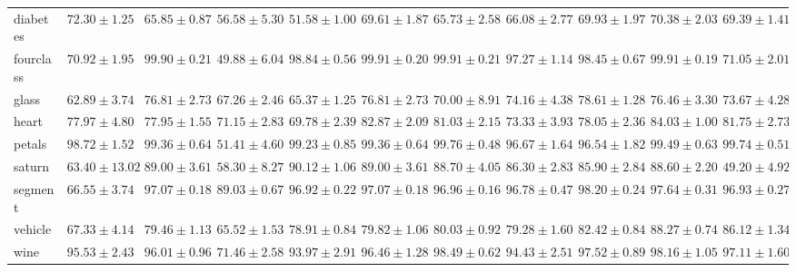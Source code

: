 \begin{sidewaystable}
\begin{tabular}{l||l|l|l|l|l|l|l|l|l|l|}
diabetes& $\mathbf{72.30\pm1.25}$& $65.85\pm0.87$& $56.58\pm5.30$& $51.58\pm1.00$& $69.61\pm1.87$& $65.73\pm2.58$& $66.08\pm2.77$& $69.93\pm1.97$& $70.38\pm2.03$& $69.39\pm1.41$\\ 
fourclass& $70.92\pm1.95$& $\mathbf{99.90\pm0.21}$& $49.88\pm6.04$& $98.84\pm0.56$& $\mathbf{99.91\pm0.20}$& $\mathbf{99.91\pm0.21}$& $97.27\pm1.14$& $98.45\pm0.67$& $\mathbf{99.91\pm0.19}$& $71.05\pm2.01$\\ 
glass& $62.89\pm3.74$& $76.81\pm2.73$& $67.26\pm2.46$& $65.37\pm1.25$& $76.81\pm2.73$& $70.00\pm8.91$& $74.16\pm4.38$& $\mathbf{78.61\pm1.28}$& $76.46\pm3.30$& $73.67\pm4.28$\\ 
heart& $77.97\pm4.80$& $77.95\pm1.55$& $71.15\pm2.83$& $69.78\pm2.39$& $82.87\pm2.09$& $81.03\pm2.15$& $73.33\pm3.93$& $78.05\pm2.36$& $\mathbf{84.03\pm1.00}$& $81.75\pm2.73$\\ 
petals& $98.72\pm1.52$& $99.36\pm0.64$& $51.41\pm4.60$& $99.23\pm0.85$& $99.36\pm0.64$& $\mathbf{99.76\pm0.48}$& $96.67\pm1.64$& $96.54\pm1.82$& $99.49\pm0.63$& $\mathbf{99.74\pm0.51}$\\ 
saturn& $63.40\pm13.02$& $89.00\pm3.61$& $58.30\pm8.27$& $\mathbf{90.12\pm1.06}$& $89.00\pm3.61$& $88.70\pm4.05$& $86.30\pm2.83$& $85.90\pm2.84$& $88.60\pm2.20$& $49.20\pm4.92$\\ 
segment& $66.55\pm3.74$& $97.07\pm0.18$& $89.03\pm0.67$& $96.92\pm0.22$& $97.07\pm0.18$& $96.96\pm0.16$& $96.78\pm0.47$& $\mathbf{98.20\pm0.24}$& $97.64\pm0.31$& $96.93\pm0.27$\\ 
vehicle& $67.33\pm4.14$& $79.46\pm1.13$& $65.52\pm1.53$& $78.91\pm0.84$& $79.82\pm1.06$& $80.03\pm0.92$& $79.28\pm1.60$& $82.42\pm0.84$& $\mathbf{88.27\pm0.74}$& $86.12\pm1.34$\\ 
wine& $95.53\pm2.43$& $96.01\pm0.96$& $71.46\pm2.58$& $93.97\pm2.91$& $96.46\pm1.28$& $\mathbf{98.49\pm0.62}$& $94.43\pm2.51$& $97.52\pm0.89$& $98.16\pm1.05$& $97.11\pm1.60$\\ 
\end{tabular}
\end{sidewaystable}

